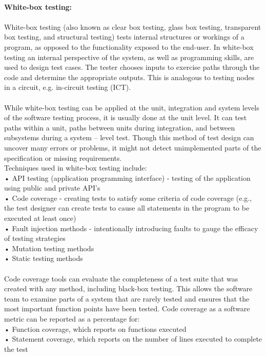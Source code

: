 \documentclass[11pt,a4paper]{report}
\begin{document}
\textbf{\\White-box testing:\\}
\paragraph{}White-box testing (also known as clear box testing, glass box testing, transparent box testing, and structural testing) tests internal structures or workings of a program, as opposed to the functionality exposed to the end-user. In white-box testing an internal perspective of the system, as well as programming skills, are used to design test cases. The tester chooses inputs to exercise paths through the code and determine the appropriate outputs. This is analogous to testing nodes in a circuit, e.g. in-circuit testing (ICT).\\
\paragraph{} While white-box testing can be applied at the unit, integration and system levels of the software testing process, it is usually done at the unit level. It can test paths within a unit, paths between units during integration, and between subsystems during a system – level test. Though this method of test design can uncover many errors or problems, it might not detect unimplemented parts of the specification or missing requirements.\\
Techniques used in white-box testing include:\\
•	API testing (application programming interface) - testing of the application using public and private API's\\
•	Code coverage - creating tests to satisfy some criteria of code coverage (e.g., the test designer can create tests to cause all statements in the program to be executed at least once)\\
•	Fault injection methods - intentionally introducing faults to gauge the efficacy of testing strategies\\
•	Mutation testing methods\\
•	Static testing methods\\
\paragraph{}Code coverage tools can evaluate the completeness of a test suite that was created with any method, including black-box testing. This allows the software team to examine parts of a system that are rarely tested and ensures that the most important function points have been tested. Code coverage as a software metric can be reported as a percentage for:\\
•	Function coverage, which reports on functions executed\\
•	Statement coverage, which reports on the number of lines executed to complete the test\\
\end{document}
